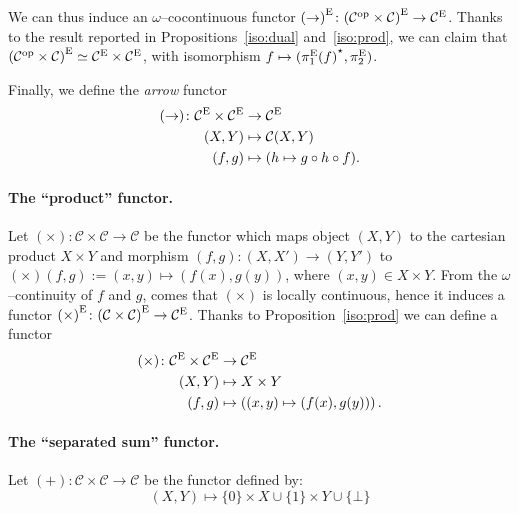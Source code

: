 We can thus induce an \(\omega\)--cocontinuous functor \({(\rightarrow)}^\textup{E} \colon {(\mathcal{C}^\textup{op} \times \mathcal{C})}^\textup{E}\to \mathcal{C}^\textup{E}\). %
Thanks to the result reported in Propositions~\ref{iso:dual} and~\ref{iso:prod}, we can claim that \({(\mathcal{C}^\textup{op} \times \mathcal{C})}^\textup{E} \simeq \mathcal{C}^\textup{E} \times \mathcal{C}^\textup{E}\), with isomorphism
\(f \mapsto ({\pi_1^\textup{E}(f)}^\star, \pi_2^\textup{E})\).

Finally, we define the \emph{arrow} functor
\begin{equation*}
  \begin{split}
    (\rightarrow) \colon \mathcal{C}^\textup{E} \times \mathcal{C}^\textup{E} &\to \mathcal{C}^\textup{E} \\
    (X,Y) &\mapsto \mathcal{C}(X,Y) \\
    (f,g) &\mapsto (h \mapsto g \circ h \circ f).
  \end{split}
\end{equation*}

\paragraph{The ``product'' functor.}
Let \((\times) \colon \mathcal{C} \times \mathcal{C} \to \mathcal{C}\) be the functor which maps object \((X,Y)\) to the cartesian product \(X \times Y\) and morphism \((f,g) \colon (X,X') \to (Y,Y')\) to
\((\times)(f,g) := (x,y) \mapsto (f(x),g(y))\), where \((x,y) \in X \times Y\).
From the \(\omega\)--continuity of \(f\) and \(g\), comes that \((\times)\) is locally continuous, hence it induces a functor
\({(\times)}^\textup{E} \colon {(\mathcal{C} \times \mathcal{C})}^\textup{E} \to \mathcal{C}^\textup{E}\).
Thanks to Proposition~\ref{iso:prod} we can define a functor
\begin{equation*}
  \begin{split}
    (\times) \colon \mathcal{C}^\textup{E} \times \mathcal{C}^\textup{E} &\to \mathcal{C}^\textup{E} \\
    (X,Y) &\mapsto X \times Y \\
    (f,g) &\mapsto \left((x,y) \mapsto (f(x),g(y))\right).
  \end{split}
\end{equation*}

\paragraph{The ``separated sum'' functor.}
Let \((+) \colon \mathcal{C} \times \mathcal{C} \to \mathcal{C}\) be the functor defined by:
\begin{equation*}
  (X,Y) \mapsto \lbrace 0 \rbrace \times X \cup \lbrace 1 \rbrace \times Y \cup \lbrace \bot \rbrace
\end{equation*}
